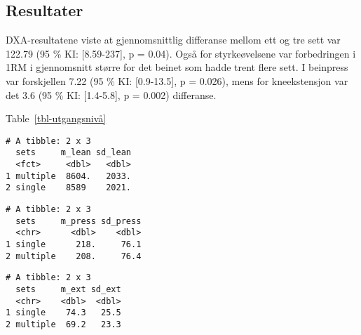 \documentclass[
  letterpaper,
  DIV=11,
  numbers=noendperiod]{scrartcl}
\begin{document}
\hypertarget{resultater}{%
\subsection{Resultater}\label{resultater}}

DXA-resultatene viste at gjennomsnittlig differanse mellom ett og tre
sett var 122.79 (95 \% KI: {[}8.59-237{]}, p = 0.04). Også for
styrkeøvelsene var forbedringen i 1RM i gjennomsnitt større for det
beinet som hadde trent flere sett. I beinpress var forskjellen 7.22 (95
\% KI: {[}0.9-13.5{]}, p = 0.026), mens for kneekstensjon var det 3.6
(95 \% KI: {[}1.4-5.8{]}, p = 0.002) differanse.

Table~\ref{tbl-utgangsnivå}

\begin{table}

\caption{\label{tbl-utgangsnivå}\textbf{?(caption)}}\begin{minipage}[t]{\linewidth}

{\centering 

\begin{verbatim}
# A tibble: 2 x 3
  sets     m_lean sd_lean
  <fct>     <dbl>   <dbl>
1 multiple  8604.   2033.
2 single    8589    2021.
\end{verbatim}

}

\end{minipage}%
\newline
\begin{minipage}[t]{\linewidth}

{\centering 

\begin{verbatim}
# A tibble: 2 x 3
  sets     m_press sd_press
  <chr>      <dbl>    <dbl>
1 single      218.     76.1
2 multiple    208.     76.4
\end{verbatim}

}

\end{minipage}%
\newline
\begin{minipage}[t]{\linewidth}

{\centering 

\begin{verbatim}
# A tibble: 2 x 3
  sets     m_ext sd_ext
  <chr>    <dbl>  <dbl>
1 single    74.3   25.5
2 multiple  69.2   23.3
\end{verbatim}

}

\end{minipage}%
\newline
\begin{minipage}[t]{\linewidth}
\subcaption{\label{tbl-utgangsnivå-1}}


\end{minipage}
\end{table}
\end{document}
